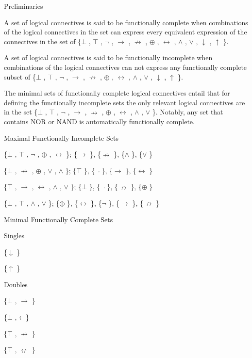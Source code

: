 \protect\hypertarget{anchor}{}{}Preliminaries

A set of logical connectives is said to be functionally complete when
combinations of the logical connectives in the set can express every
equivalent expression of the connectives in the set of \{$\bot$ , $\top$ , $\neg$ , $\to$ , $\nrightarrow$ ,
$\oplus$ , $\leftrightarrow$ , $\land$ , $\lor$ , $\downarrow$ , $\uparrow$ \}.

A set of logical connectives is said to be functionally incomplete when
combinations of the logical connectives can not express any functionally
complete subset of \{$\bot$ , $\top$ , $\neg$ , $\to$ , $\nrightarrow$ , $\oplus$ , $\leftrightarrow$ , $\land$ , $\lor$ , $\downarrow$ , $\uparrow$ \}.

The minimal sets of functionally complete logical connectives entail
that for defining the functionally incomplete sets the only relevant
logical connectives are in the set \{$\bot$ , $\top$ , $\neg$ , $\to$ , $\nrightarrow$ , $\oplus$ , $\leftrightarrow$ , $\land$ , $\lor$ \}.
Notably, any set that contains NOR or NAND is automatically functionally
complete.

\protect\hypertarget{anchor-1}{}{}Maximal Functionally Incomplete Sets

\{$\bot$ , $\top$ , $\neg$ , $\oplus$ , $\leftrightarrow$ \}; \{$\to$ \}, \{$\nrightarrow$ \}, \{$\land$ \}, \{$\lor$ \}

\{$\bot$ , $\nrightarrow$ , $\oplus$ , $\lor$ , $\land$ \}; \{$\top$ \}, \{$\neg$ \}, \{$\to$ \}, \{$\leftrightarrow$ \}

\{$\top$ , $\to$ , $\leftrightarrow$ , $\land$ , $\lor$ \}; \{$\bot$ \}, \{$\neg$ \}, \{$\nrightarrow$ \}, \{$\oplus$ \}

\{$\bot$ , $\top$ , $\land$ , $\lor$ \}; \{$\oplus$ \}, \{$\leftrightarrow$ \}, \{$\neg$ \}, \{$\to$ \}, \{$\nrightarrow$ \}

\protect\hypertarget{anchor-2}{}{}Minimal Functionally Complete Sets

\protect\hypertarget{anchor-3}{}{}Singles

\{$\downarrow$ \}

\{$\uparrow$ \}

\protect\hypertarget{anchor-4}{}{}Doubles

\{$\bot$ , $\to$ \}

\{$\bot$ , ←\}

\{$\top$ , $\nrightarrow$ \}

\{$\top$ , $\nleftarrow$ \}


